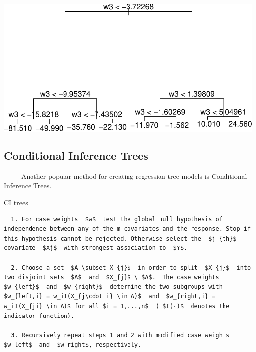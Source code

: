 \documentclass[12pt,twoside]{reedthesis}
\begin{document}
  \begin{Shaded}
  \begin{Highlighting}[]
  \end{Highlighting}
  \end{Shaded}
  
  \begin{center}\includegraphics{Thesis_files/figure-latex/unnamed-chunk-1-3} \end{center}
  
  \subsection{Conditional Inference
  Trees}\label{conditional-inference-trees}
  
  ~~~~~Another popular method for creating regression tree models is
  Conditional Inference Trees.
  
  CI trees
  
  \begin{verbatim}
  1. For case weights  $w$  test the global null hypothesis of independence between any of the m covariates and the response. Stop if this hypothesis cannot be rejected. Otherwise select the  $j_{th}$  covariate  $Xj$  with strongest association to  $Y$.
  
  2. Choose a set  $A \subset X_{j}$  in order to split  $X_{j}$  into two disjoint sets  $A$  and  $X_{j}$ \ $A$.  The case weights  $w_{left}$  and  $w_{right}$  determine the two subgroups with  $w_{left,i} = w_iI(X_{j\cdot i} \in A)$  and  $w_{right,i} = w_iI(X_{ji} \in A)$ for all $i = 1,...,n$  ( $I(·)$  denotes the indicator function). 
  
  3. Recursively repeat steps 1 and 2 with modified case weights  $w_left$  and  $w_right$, respectively. 
  \end{verbatim}
  
\end{document}
